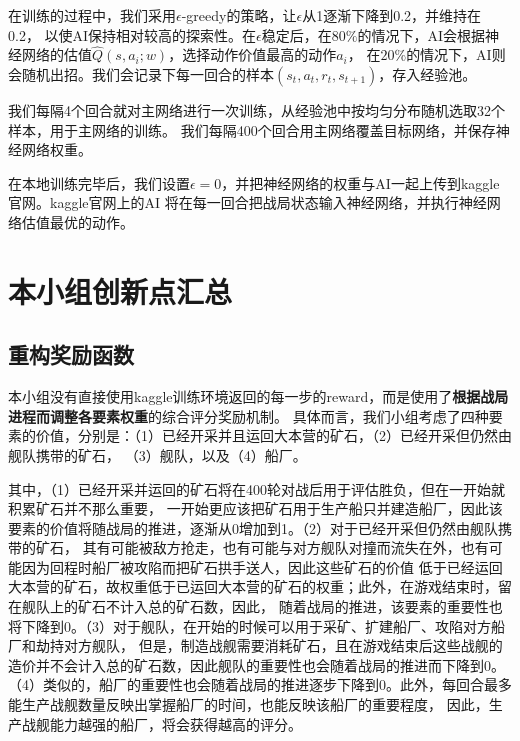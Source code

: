 \documentclass[10pt]{article}
\begin{document}
在训练的过程中，我们采用$\epsilon$-greedy的策略，让$\epsilon$从1逐渐下降到0.2，并维持在0.2，
以使AI保持相对较高的探索性。在$\epsilon$稳定后，在$80\%$的情况下，AI会根据神经网络的估值$\hat{Q}(s,a_i;w)$，选择动作价值最高的动作$a_i$，
在$20\%$的情况下，AI则会随机出招。我们会记录下每一回合的样本$(s_t,a_t,r_t,s_{t+1})$，存入经验池。

我们每隔4个回合就对主网络进行一次训练，从经验池中按均匀分布随机选取32个样本，用于主网络的训练。
我们每隔400个回合用主网络覆盖目标网络，并保存神经网络权重。

在本地训练完毕后，我们设置$\epsilon=0$，并把神经网络的权重与AI一起上传到kaggle官网。kaggle官网上的AI
将在每一回合把战局状态输入神经网络，并执行神经网络估值最优的动作。


\section{本小组创新点汇总}
\subsection{重构奖励函数}
本小组没有直接使用kaggle训练环境返回的每一步的reward，而是使用了\textbf{根据战局进程而调整各要素权重}的综合评分奖励机制。
具体而言，我们小组考虑了四种要素的价值，分别是：（1）已经开采并且运回大本营的矿石，（2）已经开采但仍然由舰队携带的矿石，
（3）舰队，以及（4）船厂。

其中，（1）已经开采并运回的矿石将在400轮对战后用于评估胜负，但在一开始就积累矿石并不那么重要，
一开始更应该把矿石用于生产船只并建造船厂，因此该要素的价值将随战局的推进，逐渐从0增加到1。（2）对于已经开采但仍然由舰队携带的矿石，
其有可能被敌方抢走，也有可能与对方舰队对撞而流失在外，也有可能因为回程时船厂被攻陷而把矿石拱手送人，因此这些矿石的价值
低于已经运回大本营的矿石，故权重低于已运回大本营的矿石的权重；此外，在游戏结束时，留在舰队上的矿石不计入总的矿石数，因此，
随着战局的推进，该要素的重要性也将下降到0。（3）对于舰队，在开始的时候可以用于采矿、扩建船厂、攻陷对方船厂和劫持对方舰队，
但是，制造战舰需要消耗矿石，且在游戏结束后这些战舰的造价并不会计入总的矿石数，因此舰队的重要性也会随着战局的推进而下降到0。
（4）类似的，船厂的重要性也会随着战局的推进逐步下降到0。此外，每回合最多能生产战舰数量反映出掌握船厂的时间，也能反映该船厂的重要程度，
因此，生产战舰能力越强的船厂，将会获得越高的评分。
\end{document}
